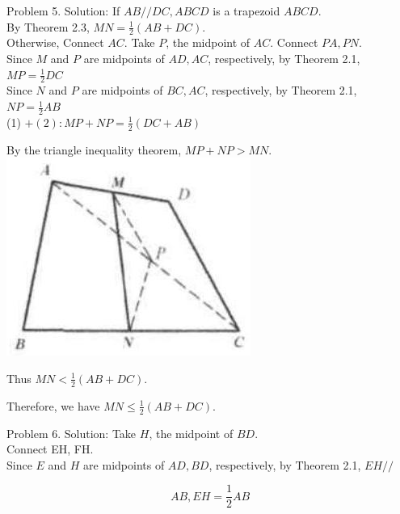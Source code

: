 \documentclass[10pt]{article}
\begin{document}
Problem 5. Solution:
If \(A B / / D C, A B C D\) is a trapezoid \(A B C D\).\\
By Theorem 2.3, \(M N=\frac{1}{2}(A B+D C)\).\\
Otherwise, Connect \(A C\). Take \(P\), the midpoint of \(A C\). Connect \(P A, P N\).\\
Since \(M\) and \(P\) are midpoints of \(A D, A C\), respectively, by Theorem 2.1,\\
\(M P=\frac{1}{2} D C\)\\
Since \(N\) and \(P\) are midpoints of \(B C, A C\), respectively, by Theorem 2.1,\\
\(N P=\frac{1}{2} A B\)\\
(1) \(+(2): M P+N P=\frac{1}{2}(D C+A B)\)

By the triangle inequality theorem, \(M P+N P>M N\).\\
\includegraphics[max width=\textwidth, center]{2025_04_17_97bc1f7e44d93c271a88g-049}

Thus \(M N<\frac{1}{2}(A B+D C)\).


Therefore, we have \(M N \leq \frac{1}{2}(A B+D C)\).

Problem 6. Solution:
Take \(H\), the midpoint of \(B D\).\\
Connect EH, FH.\\
Since \(E\) and \(H\) are midpoints of \(A D, B D\), respectively, by Theorem 2.1, \(E H / /\)

\[
A B, E H=\frac{1}{2} A B
\]
\end{document}
